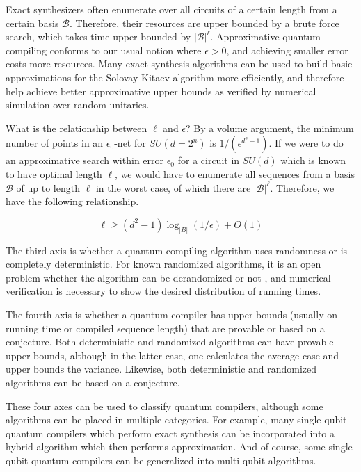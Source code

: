 Exact synthesizers often enumerate over all circuits of
a certain length from a certain basis $\mathcal{B}$. Therefore, their
resources are upper bounded by a brute force search, which takes
time upper-bounded by $|\mathcal{B}|^{\ell}$.
Approximative quantum compiling conforms to our usual notion where
$\epsilon > 0$, and achieving smaller error costs more resources. Many
exact synthesis algorithms can be used to build basic approximations
for the Solovay-Kitaev algorithm more efficiently, and therefore help
achieve better approximative upper bounds as verified by numerical
simulation over random unitaries.

What is the relationship between $\ell$ and $\epsilon$? By a volume
argument, the minimum number of points in an $\epsilon_0$-net for
$SU(d=2^n)$ is $1/(\epsilon^{d^2 - 1})$. If we were to do an approximative
search within error $\epsilon_0$
for a circuit in $SU(d)$ which is known to have optimal length
$\ell$, we would have to enumerate all sequences from a basis $\mathcal{B}$
of up to length $\ell$ in the worst case, of which there are $|\mathcal{B}|^{\ell}$.
Therefore, we have the following relationship.

\begin{equation}
\ell \ge (d^2 - 1) \log_{|B|}(1/\epsilon) + O(1)
\end{equation}

The third axis is whether a quantum compiling algorithm uses randomness
or is completely deterministic. For known randomized algorithms, it is
an open problem whether the algorithm can be derandomized or not
\cite{Kliuchnikov2012}, and numerical verification is necessary to
show the desired distribution of running times.

The fourth axis is whether a quantum compiler has upper bounds
(usually on running time or compiled sequence length) that are provable or
based on a conjecture. Both deterministic and randomized
algorithms can have provable upper bounds, although
in the latter case, one calculates the average-case and upper bounds the
variance. Likewise, both deterministic and randomized algorithms can
be based on a conjecture.

These four axes can be used to classify quantum compilers, although some
algorithms can be placed in multiple categories. For example, many
single-qubit quantum compilers which perform exact synthesis can be
incorporated into a hybrid algorithm which then performs
approximation. And of course, some single-qubit quantum compilers can be generalized
into multi-qubit algorithms.

